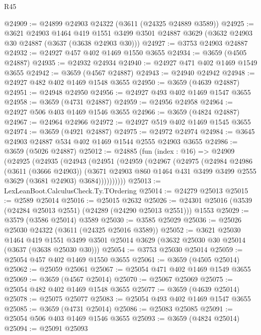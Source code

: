 \begin{lexlean}{R45}
\begin{coremodule}
@24909 := @24899 @24903 @24322 (@3611 (@24325 @24889 @3589))
@24925 := @3621
    @24903
    @1464
    @419
    @1551
    @3499
    @3501
    @24887
    @3629
    (@3632 @24903 @30 @24887 (@3637 (@3638 @24903 @30)))
@24927 := @3753 @24903 @24887
@24932 := @24927 @457 @402 @1469 @1550 @3655
@24934 := @3659 (@4505 @24887)
@24935 := @24932 @24934
@24940 := @24927 @471 @402 @1469 @1549 @3655
@24942 := @3659 (@4567 @24887)
@24943 := @24940 @24942
@24948 := @24927 @482 @402 @1469 @1548 @3655
@24950 := @3659 (@4639 @24887)
@24951 := @24948 @24950
@24956 := @24927 @493 @402 @1469 @1547 @3655
@24958 := @3659 (@4731 @24887)
@24959 := @24956 @24958
@24964 := @24927 @506 @403 @1469 @1546 @3655
@24966 := @3659 (@4824 @24887)
@24967 := @24964 @24966
@24972 := @24927 @519 @402 @1469 @1545 @3655
@24974 := @3659 (@4921 @24887)
@24975 := @24972 @24974
@24984 := @3645 @24903 @24887 @534 @402 @1469 @1544 @2555 @24903 @3655
@24986 := @3659 (@5026 @24887)
@25012 := @24885
    (fun (index : @16) =>
    @24909
      (@24925
        (@24935
          (@24943
            (@24951
              (@24959
                (@24967
                  (@24975
                    (@24984
                      @24986
                      (@3611 (@3666 @24903))
                      (@3671
                        @24903
                        @860
                        @1464
                        @431
                        @3499
                        @3499
                        @2555
                        @3629
                        (@3681 @24903)
                        @3684))))))))))
@25013 := LexLeanBoot.CalculusCheck.Ty.TOrdering
@25014 := @24279 @25013
@25015 := @2589 @25014
@25016 := @25015 @2632
@25026 := @24301 @25016 (@3539 (@24284 @25013 @2551) (@24289 (@24290 @25013 @2551))) @1553
@25029 := @3579 (@3586 @25014) @3589
@25030 := @3585 @25029
@25036 := @25026 @25030 @24322 (@3611 (@24325 @25016 @3589))
@25052 := @3621
    @25030
    @1464
    @419
    @1551
    @3499
    @3501
    @25014
    @3629
    (@3632 @25030 @30 @25014 (@3637 (@3638 @25030 @30)))
@25054 := @3753 @25030 @25014
@25059 := @25054 @457 @402 @1469 @1550 @3655
@25061 := @3659 (@4505 @25014)
@25062 := @25059 @25061
@25067 := @25054 @471 @402 @1469 @1549 @3655
@25069 := @3659 (@4567 @25014)
@25070 := @25067 @25069
@25075 := @25054 @482 @402 @1469 @1548 @3655
@25077 := @3659 (@4639 @25014)
@25078 := @25075 @25077
@25083 := @25054 @493 @402 @1469 @1547 @3655
@25085 := @3659 (@4731 @25014)
@25086 := @25083 @25085
@25091 := @25054 @506 @403 @1469 @1546 @3655
@25093 := @3659 (@4824 @25014)
@25094 := @25091 @25093

\end{coremodule}
\end{lexlean}
